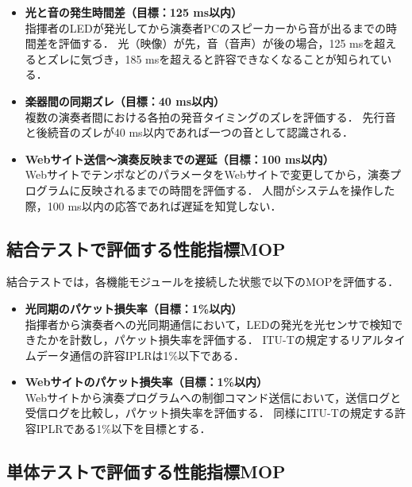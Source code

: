 \documentclass[lualatex,book,openany,paper=a4paper,jafontsize=11.5pt,jafontscale=1.05]{jlreq}
\begin{document}
\begin{itemize}
    \item \textbf{光と音の発生時間差（目標：125 ms以内）} \\
    指揮者のLEDが発光してから演奏者PCのスピーカーから音が出るまでの時間差を評価する．
    光（映像）が先，音（音声）が後の場合，125 msを超えるとズレに気づき，185 msを超えると許容できなくなることが知られている\cite{1998}．

    \item \textbf{楽器間の同期ズレ（目標：40 ms以内）} \\
    複数の演奏者間における各拍の発音タイミングのズレを評価する．
    先行音と後続音のズレが40 ms以内であれば一つの音として認識される\cite{brown}．

    \item \textbf{Webサイト送信〜演奏反映までの遅延（目標：100 ms以内）} \\
    WebサイトでテンポなどのパラメータをWebサイトで変更してから，演奏プログラムに反映されるまでの時間を評価する．
    人間がシステムを操作した際，100 ms以内の応答であれば遅延を知覚しない\cite{1968}．
\end{itemize}

\subsection{結合テストで評価する性能指標MOP}

結合テストでは，各機能モジュールを接続した状態で以下のMOPを評価する．

\begin{itemize}
    \item \textbf{光同期のパケット損失率（目標：1\%以内）} \\
    指揮者から演奏者への光同期通信において，LEDの発光を光センサで検知できたかを計数し，パケット損失率を評価する．
    ITU-Tの規定するリアルタイムデータ通信の許容IPLRは1\%以下である\cite{1541}．

    \item \textbf{Webサイトのパケット損失率（目標：1\%以内）} \\
    Webサイトから演奏プログラムへの制御コマンド送信において，送信ログと受信ログを比較し，パケット損失率を評価する．
    同様にITU-Tの規定する許容IPLRである1\%以下を目標とする\cite{1541}．
\end{itemize}

\subsection{単体テストで評価する性能指標MOP}
\end{document}
